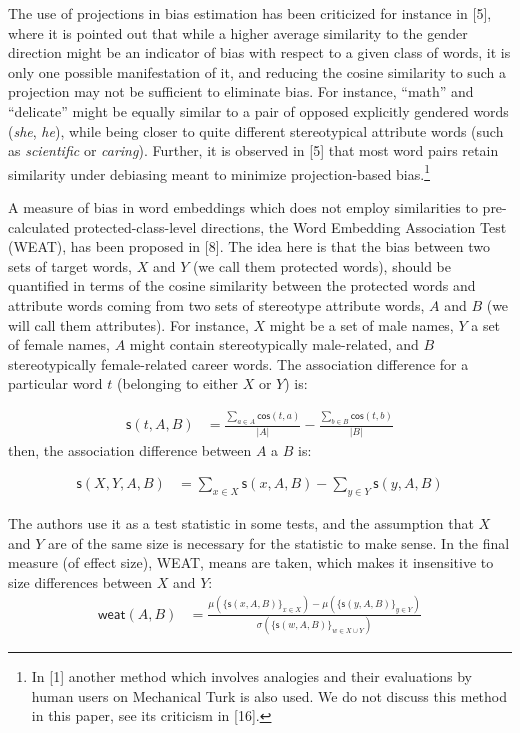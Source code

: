 \documentclass[
  12pt,
  dvipsnames,enabledeprecatedfontcommands]{scrartcl}
\begin{document}
The use of projections in bias estimation has been criticized for
instance in {[}5{]}, where it is pointed out that while a higher average
similarity to the gender direction might be an indicator of bias with
respect to a given class of words, it is only one possible manifestation
of it, and reducing the cosine similarity to such a projection may not
be sufficient to eliminate bias. For instance, ``math'' and ``delicate''
might be equally similar to a pair of opposed explicitly gendered words
(\emph{she}, \emph{he}), while being closer to quite different
stereotypical attribute words (such as \emph{scientific} or
\emph{caring}). Further, it is observed in {[}5{]} that most word pairs
retain similarity under debiasing meant to minimize projection-based
bias.\footnote{In {[}1{]} another method which involves analogies and
  their evaluations by human users on Mechanical Turk is also used. We
  do not discuss this method in this paper, see its criticism in
  {[}16{]}.}

A measure of bias in word embeddings which does not employ similarities
to pre-calculated protected-class-level directions, the Word Embedding
Association Test (\textsf{WEAT}), has been proposed in {[}8{]}. The idea
here is that the bias between two sets of target words, \(X\) and \(Y\)
(we call them protected words), should be quantified in terms of the
cosine similarity between the protected words and attribute words coming
from two sets of stereotype attribute words, \(A\) and \(B\) (we will
call them attributes). For instance, \(X\) might be a set of male names,
\(Y\) a set of female names, \(A\) might contain stereotypically
male-related, and \(B\) stereotypically female-related career words. The
association difference for a particular word \(t\) (belonging to either
\(X\) or \(Y\)) is:

\vspace{-2mm}

\begin{align}
\label{eq:stAB}
\mathsf{s}(t,A,B) & = \frac{\sum_{a\in A}\mathsf{cos}(t,a)}{\vert A\vert} - \frac{\sum_{b\in B}\mathsf{cos}(t,b)}{\vert B\vert}
\end{align} \normalsize \noindent then, the association difference
between \(A\) a \(B\) is:

\begin{align}
\label{eq:sXYAB}
\mathsf{s}(X,Y,A,B) & = \sum_{x\in X} \mathsf{s}(x,A,B) -  \sum_{y\in Y} \mathsf{s}(y,A,B)
\end{align}

\noindent The authors use it as a test statistic in some tests, and the
assumption that \(X\) and \(Y\) are of the same size is necessary for
the statistic to make sense. In the final measure (of effect size),
\textsf{WEAT}, means are taken, which makes it insensitive to size
differences between \(X\) and \(Y\): \begin{align}
\mathsf{weat}(A,B) & = \frac{
\mu(\{\mathsf{s}(x,A,B)\}_{x\in X}) -\mu(\{\mathsf{s}(y,A,B)\}_{y\in Y}) 
}{
\sigma(\{\mathsf{s}(w,A,B)\}_{w\in X\cup Y})
}
\end{align}
\end{document}
